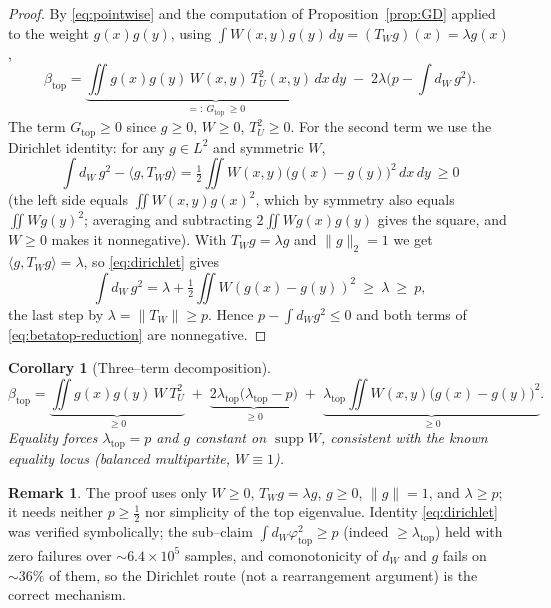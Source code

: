 \documentclass[11pt]{article}
\newtheorem{corollary}[theorem]{Corollary}
\theoremstyle{definition}
\newtheorem{remark}[theorem]{Remark}
\newcommand{\supp}{\operatorname{supp}}
\newcommand{\tw}{T_W}
\newcommand{\tu}{T_U}
\begin{document}
\begin{proof}
By \eqref{eq:pointwise} and the computation of Proposition~\ref{prop:GD} applied
to the weight $g(x)g(y)$, using $\int W(x,y)g(y)\,dy=(\tw g)(x)=\lambda g(x)$,
\begin{equation}\label{eq:betatop-reduction}
  \beta_{\mathrm{top}}
  =\underbrace{\iint g(x)g(y)\,W(x,y)\,\tu^2(x,y)\,dx\,dy}_{=:~G_{\mathrm{top}}\ \ge0}
  \;-\;2\lambda\Big(p-\int d_W\,g^2\Big).
\end{equation}
The term $G_{\mathrm{top}}\ge0$ since $g\ge0$, $W\ge0$, $\tu^2\ge0$.  For the
second term we use the Dirichlet identity: for any $g\in L^2$ and symmetric $W$,
\begin{equation}\label{eq:dirichlet}
  \int d_W\,g^2-\langle g,\tw g\rangle
  =\tfrac12\iint W(x,y)\big(g(x)-g(y)\big)^2\,dx\,dy\ \ge0
\end{equation}
(the left side equals $\iint W(x,y)g(x)^2$, which by symmetry also equals
$\iint W g(y)^2$; averaging and subtracting $2\iint W g(x)g(y)$ gives the square,
and $W\ge0$ makes it nonnegative).  With $\tw g=\lambda g$ and $\|g\|_2=1$ we get
$\langle g,\tw g\rangle=\lambda$, so \eqref{eq:dirichlet} gives
\begin{equation}\label{eq:degree-lb}
  \int d_W\,g^2=\lambda+\tfrac12\!\iint W(g(x)-g(y))^2
  \ \ge\ \lambda\ \ge\ p ,
\end{equation}
the last step by $\lambda=\|\tw\|\ge p$.  Hence $p-\int d_W g^2\le0$ and both
terms of \eqref{eq:betatop-reduction} are nonnegative.
\end{proof}

\begin{corollary}[Three--term decomposition]\label{cor:threeterm}
\[
  \beta_{\mathrm{top}}
  =\underbrace{\iint g(x)g(y)\,W\,\tu^2}_{\ge0}
  \;+\;\underbrace{2\lambda_{\mathrm{top}}\big(\lambda_{\mathrm{top}}-p\big)}_{\ge0}
  \;+\;\underbrace{\lambda_{\mathrm{top}}\!\iint W(x,y)\big(g(x)-g(y)\big)^2}_{\ge0}.
\]
Equality forces $\lambda_{\mathrm{top}}=p$ and $g$ constant on $\supp W$,
consistent with the known equality locus (balanced multipartite, $W\equiv1$).
\end{corollary}

\begin{remark}
The proof uses only $W\ge0$, $\tw g=\lambda g$, $g\ge0$, $\|g\|=1$, and
$\lambda\ge p$; it needs neither $p\ge\tfrac12$ nor simplicity of the top
eigenvalue.  Identity \eqref{eq:dirichlet} was verified symbolically; the
sub--claim $\int d_W\varphi_{\mathrm{top}}^2\ge p$ (indeed $\ge\lambda_{\mathrm{top}}$)
held with zero failures over ${\sim}6.4\times10^5$ samples, and comonotonicity of
$d_W$ and $g$ fails on ${\sim}36\%$ of them, so the Dirichlet route (not a
rearrangement argument) is the correct mechanism.
\end{remark}
\end{document}
